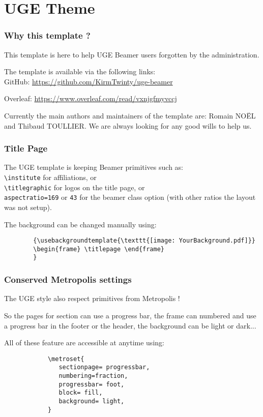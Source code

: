 %
\section{UGE Theme}

	\begin{frame}
		\frametitle{Why this template ?}

		This template is here to help UGE Beamer users forgotten by the administration.
		\bigskip

		The template is available via the following links:\\
		\textbullet GitHub: %
		\url{https://github.com/KirmTwinty/uge-beamer}

		\textbullet Overleaf: %
		\url{https://www.overleaf.com/read/vxnjgfmyvccj}
		\bigskip

		Currently the main authors and maintainers of the template are:
		Romain NOËL and Thibaud TOULLIER.\newline
		We are always looking for any good wills to help us.
	\end{frame}


	\begin{frame}[fragile]
		\frametitle{Title Page}

		The UGE template is keeping Beamer primitives such as: \\
		\quad \verb#\institute# for affiliations, or \\
		\quad \verb#\titlegraphic# for logos on the title page, or \\
		\quad \verb#aspectratio=169# or \verb|43| for the beamer class option (with other ratios the layout was not setup).
		\bigskip
		
		The background can be changed manually using:
		\begin{verbatim} 
		{\usebackgroundtemplate{\texttt{[image: YourBackground.pdf]}}
		\begin{frame} \titlepage \end{frame}
		}
		\end{verbatim}
	\end{frame}


	\begin{frame}[fragile]
		\frametitle{Conserved Metropolis settings}

		The UGE style also respect primitives from Metropolis !

		So the pages for section can use a progress bar, the frame can numbered and use a progress bar in the footer or the header, the background can be light or dark...
		\bigskip

		All of these feature are accessible at anytime using:%
		\begin{verbatim}
			\metroset{
			   sectionpage= progressbar,
			   numbering=fraction,
			   progressbar= foot, 
			   block= fill,
			   background= light,
			}
		\end{verbatim}
	\end{frame}


